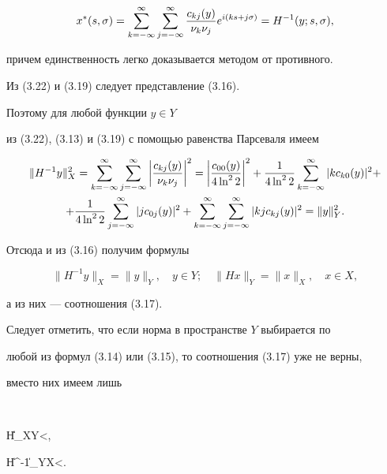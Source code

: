 \begin{equation}


x^*(s,\sigma) = \suml_{k=-\infty}^\infty\suml_{j=-\infty}^\infty


\frac{c_{kj}(y)}{\nu_k \nu_j}e^{i(ks+j\sigma)} = H^{-1}(y;s,\sigma),


\end{equation}


причем единственность легко доказывается методом от противного. 


Из (3.22) и (3.19) следует представление (3.16). 


Поэтому для любой функции $y\in Y$


из (3.22), (3.13) и (3.19) с помощью равенства Парсеваля имеем


\begin{gather*}


\|H^{-1}y\|_X^2 = \suml_{k=-\infty}^\infty\suml_{j=-\infty}^\infty


\bigg|\frac{c_{kj}(y)}{\nu_k \nu_j}\bigg|^2 = 


\bigg|\frac{c_{00}(y)}{4\ln^2 2}\bigg|^2 + \frac{1}{4\ln^2 2}


\suml_{k=-\infty}^\infty |k c_{k0}(y)|^2+ \\


%


+\frac{1}{4\ln^2 2}\suml_{j=-\infty}^\infty |j c_{0j}(y)|^2+


\suml_{k=-\infty}^\infty\suml_{j=-\infty}^\infty|kj c_{kj}(y)|^2=\|y\|^2_Y.


\end{gather*}


Отсюда и из (3.16) получим формулы


$$


\|H^{-1}y\|_X = \|y\|_Y,\quad y\in Y;\quad


\|Hx\|_Y = \|x\|_X,\quad x\in X,


$$


а из них --- соотношения (3.17).





Следует отметить, что если норма в пространстве $Y$ выбирается по 


любой из формул (3.14) или (3.15), то соотношения (3.17) уже не верны, 


вместо них имеем лишь


$$


\|H\|_{X\to Y}\lea \const <\infty,\quad


\|H^{-1}\|_{Y\to X}\lea \const <\infty.


